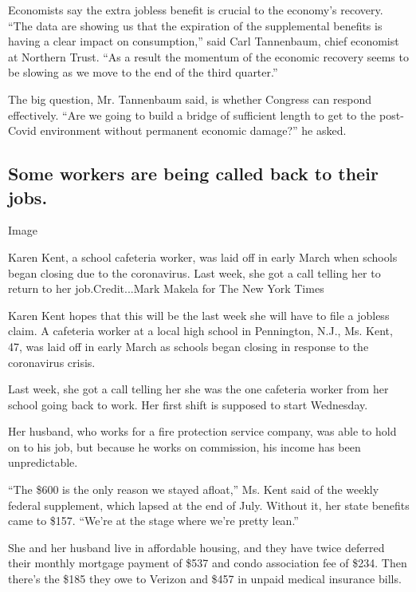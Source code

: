 Economists say the extra jobless benefit is crucial to the economy's
recovery. ``The data are showing us that the expiration of the
supplemental benefits is having a clear impact on consumption,'' said
Carl Tannenbaum, chief economist at Northern Trust. ``As a result the
momentum of the economic recovery seems to be slowing as we move to the
end of the third quarter.''

The big question, Mr. Tannenbaum said, is whether Congress can respond
effectively. ``Are we going to build a bridge of sufficient length to
get to the post-Covid environment without permanent economic damage?''
he asked.

\hypertarget{some-workers-are-being-called-back-to-their-jobs}{%
\subsection{Some workers are being called back to their
jobs.}\label{some-workers-are-being-called-back-to-their-jobs}}

Image

Karen Kent, a school cafeteria worker, was laid off in early March when
schools began closing due to the coronavirus. Last week, she got a call
telling her to return to her job.Credit...Mark Makela for The New York
Times

Karen Kent hopes that this will be the last week she will have to file a
jobless claim. A cafeteria worker at a local high school in Pennington,
N.J., Ms. Kent, 47, was laid off in early March as schools began closing
in response to the coronavirus crisis.

Last week, she got a call telling her she was the one cafeteria worker
from her school going back to work. Her first shift is supposed to start
Wednesday.

Her husband, who works for a fire protection service company, was able
to hold on to his job, but because he works on commission, his income
has been unpredictable.

``The \$600 is the only reason we stayed afloat,'' Ms. Kent said of the
weekly federal supplement, which lapsed at the end of July. Without it,
her state benefits came to \$157. ``We're at the stage where we're
pretty lean.''

She and her husband live in affordable housing, and they have twice
deferred their monthly mortgage payment of \$537 and condo association
fee of \$234. Then there's the \$185 they owe to Verizon and \$457 in
unpaid medical insurance bills.

